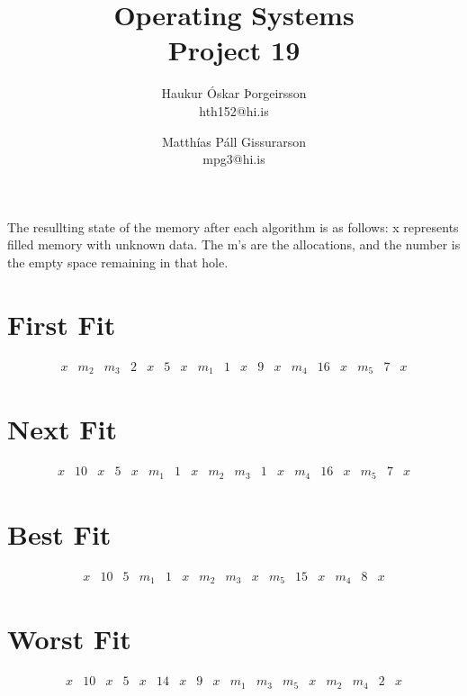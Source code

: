 \documentclass[a4]{article}
\title{Operating Systems\\
Project 19}
\author{           
    Haukur Óskar Þorgeirsson\\
    hth152@hi.is \and
    Matthías Páll Gissurarson\\
    mpg3@hi.is
}
\begin{document}
\maketitle

The resullting state of the memory after each algorithm is as follows:
x represents filled memory with unknown data. The m's are the allocations, and the number is the empty space remaining in that hole.
\section{First Fit}
$$
\begin{array}{|l|l|l|l|l|l|l|l|l|l|l|l|l|l|l|l|l|l|}
x & m_2 & m_3 & 2 & x & 5 & x & m_1 & 1 & x & 9 & x & m_4 & 16 & x & m_5 & 7 & x 
\end{array}
$$
\section{Next Fit}

$$
\begin{array}{|l|l|l|l|l|l|l|l|l|l|l|l|l|l|l|l|l|l|}
x & 10 & x & 5 & x & m_1 & 1 & x & m_2 & m_3 & 1 & x & m_4 & 16 & x & m_5 & 7 & x 
\end{array}
$$

\section{Best Fit}

$$
\begin{array}{|l|l|l|l|l|l|l|l|l|l|l|l|l|l|l|}
x & 10 & 5 & m_1 & 1 & x & m_2 & m_3 & x & m_5 & 15 & x & m_4 & 8 & x
\end{array}
$$

\section{Worst Fit}
$$
\begin{array}{|l|l|l|l|l|l|l|l|l|l|l|l|l|l|l|l|l|}
x & 10 & x & 5 & x & 14 & x & 9 & x & m_1 & m_3 & m_5 & x & m_2 & m_4 & 2 & x 
\end{array}
$$
\end{document}
